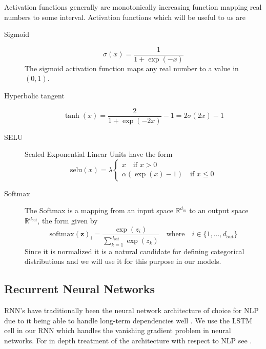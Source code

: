 Activation functions generally are monotonically increasing function mapping real
numbers to some interval. Activation functions which will be useful to us are
\begin{description}
\item[Sigmoid]
  \begin{equation}
    \label{eq:sigmoid}
    \sigma(x) = \frac{1}{1 + \exp(-x)}
  \end{equation}
  The sigmoid activation function maps any real number to a value in $(0, 1)$.
\item[Hyperbolic tangent]
  \begin{equation}
    \label{eq:tanh}
    \tanh(x) = \frac{2}{1 + \exp(-2x)} - 1 = 2 \sigma(2x) - 1
  \end{equation}
\item[SELU]
  Scaled Exponential Linear Units \cite{DBLP:journals/corr/KlambauerUMH17} have the form
  \begin{equation}
    \label{eq:SELU}
    \text{selu}(x) = \lambda
    \begin{cases}
      x \quad\text{if $x > 0$} \\
      \alpha(\exp(x) - 1) \quad \text{if $x \leq 0$}
    \end{cases}
  \end{equation}
\item[Softmax]
  The Softmax is a mapping from an input space $\mathbb{R}^{d_{in}}$ to an output
  space $\mathbb{R}^{d_{out}}$, the form given by
  \begin{equation}
    \label{eq:softmax}
    \text{softmax}(\bm{z})_i = \frac{\exp(z_i)}{\sum_{k=1}^{d_{out}}\exp(z_k)} \quad \text{where} \quad i \in \{1, \dots, d_{out}\}
  \end{equation}
  Since it is normalized it is a natural candidate for defining categorical
  distributions \cite{Barber:2012:BRM:2207809} and we will use it for this
  purpose in our models.
\end{description}

\subsection{Recurrent Neural Networks}

RNN's have traditionally been the neural network architecture of choice for NLP
due to it being able to handle long-term dependencies well \cite{KarpathyRNN}. We use the LSTM cell in our RNN which handles the vanishing gradient problem in
neural networks. For in depth treatment of the architecture with respect to NLP
see \cite{Hochreiter:1997:LSM:1246443.1246450, sundermeyer2012lstm}.

